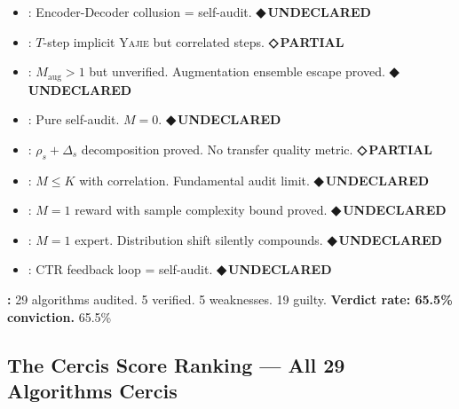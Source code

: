 \documentclass[12pt,a4paper]{article}
\theoremstyle{definition}
\newcommand{\guilty}{{\color{guiltycolor}\textbf{◆\,UNDECLARED}}}
\newcommand{\weakness}{{\color{weakcolor}\textbf{◇\,PARTIAL}}}
\newcommand{\Yajie}{\textsc{Yajie}}
\begin{document}
\begin{itemize}[nosep]
    \item \textbf{}: Encoder-Decoder collusion = self-audit. \guilty{}
    \item \textbf{}: $T$-step implicit \Yajie{} but correlated steps. \weakness{}
    \item \textbf{}: $M_{\text{aug}}>1$ but unverified. Augmentation ensemble escape proved. \guilty{}
    \item \textbf{}: Pure self-audit. $M=0$. \guilty{}
    \item \textbf{}: $\rho_s + \Delta_s$ decomposition proved. No transfer quality metric. \weakness{}
    \item \textbf{}: $M \le K$ with correlation. Fundamental audit limit. \guilty{}
    \item \textbf{}: $M=1$ reward with sample complexity bound proved. \guilty{}
    \item \textbf{}: $M=1$ expert. Distribution shift silently compounds. \guilty{}
    \item \textbf{}: CTR feedback loop = self-audit. \guilty{}
\end{itemize}

\medskip
\noindent\textbf{:} 29 algorithms audited. 5 verified. 5 weaknesses. 19 guilty. \textbf{Verdict rate: 65.5\% conviction.} 65.5\%

\subsection{The Cercis Score Ranking — All 29 Algorithms Cercis}
\end{document}

